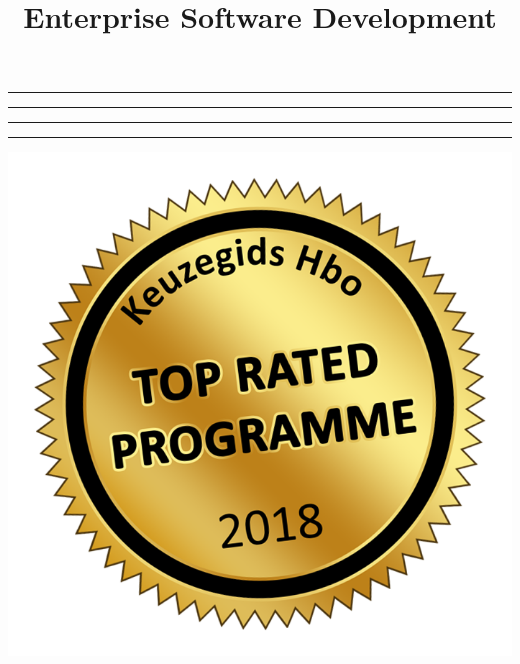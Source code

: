 \title{Enterprise Software Development}
\def\TitleImage{fontys-logo.pdf}
\providecommand\TopicBreak{\vspace{5mm}\hrule\vspace{5mm}}

\maketitle

\clearpage

\TopicBreak

\TopicBreak

\TopicBreak

\TopicBreak
\pagebreak%

\vspace{1.5cm}
\begin{center}
\includegraphics[width=.5\linewidth]{images/toprated2018-rot.png}
\end{center}

